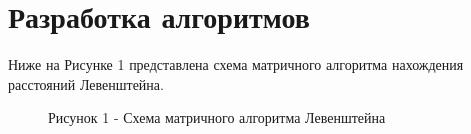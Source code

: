 \documentclass[12pt]{report}
\begin{document}
\section{Разработка алгоритмов}
Ниже на Рисунке 1 представлена схема матричного алгоритма нахождения расстояний Левенштейна.
\begin{figure}[h!]
	\caption*{Рисунок 1 - Схема матричного алгоритма Левенштейна}
\end{figure}

\restoregeometry
\end{document}
